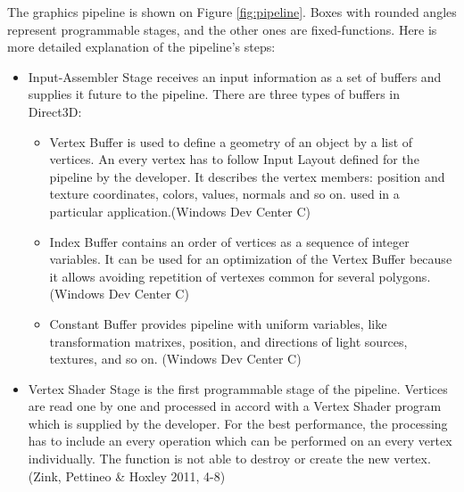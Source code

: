 \documentclass[twoside, english, 11pt]{report}
\begin{document}
The graphics pipeline is shown on Figure \ref{fig:pipeline}. Boxes with rounded angles represent programmable stages, and the other ones are fixed-functions. Here is more detailed explanation of the pipeline's steps:

\begin{itemize}
\item Input-Assembler Stage receives an input information as a set of buffers and supplies it future to the pipeline. There are three types of buffers in Direct3D:
  \begin{itemize}
    \item Vertex Buffer is used to define a geometry of an object by a list of vertices. An every vertex has to follow Input Layout defined for the pipeline by the developer. It describes the vertex members: position and texture coordinates, colors, values, normals and so on. used in a particular application.(Windows Dev Center C)
    \item Index Buffer contains an order of vertices as a sequence of integer variables. It can be used for an optimization of the Vertex Buffer because it allows avoiding repetition of vertexes common for several polygons. (Windows Dev Center C)
    \item Constant Buffer provides pipeline with uniform variables, like transformation matrixes, position, and directions of light sources, textures, and so on. (Windows Dev Center C)
  \end{itemize}
  
\item Vertex Shader Stage is the first programmable stage of the pipeline. Vertices are read one by one and processed in accord with a Vertex Shader program which is supplied by the developer. For the best performance, the processing has to include an every operation which can be performed on an every vertex individually. The function is not able to destroy or create the new vertex. (Zink, Pettineo \& Hoxley 2011, 4-8)


\end{itemize}
\end{document}
